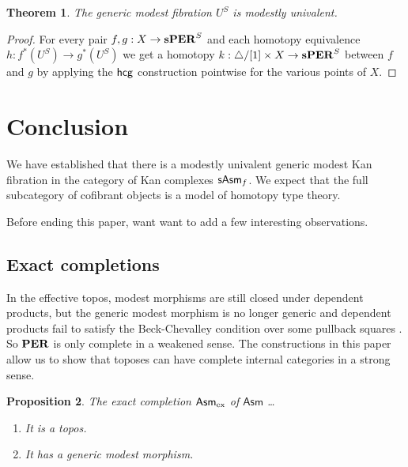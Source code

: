 \documentclass{amsart}
\theoremstyle{plain}
\newtheorem{theorem}{Theorem}
\newtheorem{prop}[theorem]{Proposition}
\theoremstyle{definition}
\newcommand\hide[1]{}
\newcommand\ri{^*}
\newcommand\Asm{\mathsf{Asm}}
\begin{document}
\hide{
Is de cograaf niet een manier om een factorisatie te geven in fibraties en cofibraties? Acyclische fibraties dan? Kunnen we dat niet toepassen om een categorie van cofibrante objecten te krijgen?

Het gaat om het morfisme $Z\to Y$. We zien dat het vuller van horns in $Z$ meestal wordt geredceert tot hetzelfde probleem in $Y$, maar nu eisen we dat de horn in $Y$ er al is\dots
Het uiterste geval met $X$ is dan nog wel een probleem
}

\begin{theorem} The generic modest fibration $U^S$ is modestly univalent. \label{univalence}\end{theorem}

\begin{proof} For every pair $f,g:X\to \mathbf{s}\mathbf{PER}^S$ and each homotopy equivalence $h:f\ri(U^S) \to g\ri(U^S)$ we get a homotopy $k:{\mathord{\triangle}}/[1]\times X \to \mathbf{s} \mathbf{PER}^S$ between $f$ and $g$ by applying the $\mathsf{hcg}$ construction pointwise for the various points of $X$. 


\end{proof}

\section{Conclusion}
We have established that there is a modestly univalent generic modest Kan fibration in the category of Kan complexes $\mathsf{sAsm}_f$. We expect that the full subcategory of cofibrant objects is a model of homotopy type theory.

Before ending this paper, want want to add a few interesting observations.

\newcommand\ex{_{\rm ex}}
\subsection{Exact completions}
In the effective topos, modest morphisms are still closed under dependent products, but the generic modest morphism is no longer generic and dependent products fail to satisfy the Beck-Chevalley condition over some pullback squares \cite{MR1023803}. So $\mathbf{PER}$ is only complete in a weakened sense. The constructions in this paper allow us to show that toposes can have complete internal categories in a strong sense.

\begin{prop} The exact completion $\Asm\ex$ of $\Asm$ \dots
\begin{enumerate}
\item It is a topos. 
\item It has a generic modest morphism.
\end{enumerate}
\end{prop}
\end{document}
